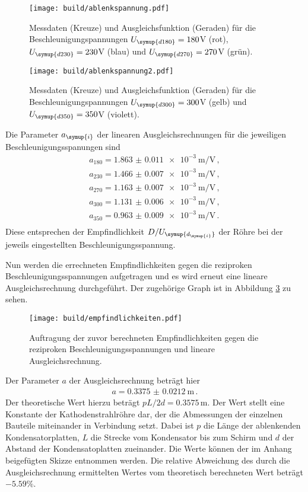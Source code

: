 \begin{figure}[]
  \centering
  \texttt{[image: build/ablenkspannung.pdf]}
  \caption{Messdaten (Kreuze) und Ausgleichsfunktion (Geraden) für die Beschleunigungspannungen
  $U_{\symup{d180}}=180$V (rot), $U_{\symup{d230}}=230$V (blau) und $U_{\symup{d270}}=270$V (grün).}
  \label{fig:ablenkspannung}
\end{figure}

\begin{figure}[]
  \centering
  \texttt{[image: build/ablenkspannung2.pdf]}
  \caption{Messdaten (Kreuze) und Ausgleichsfunktion (Geraden) für die Beschleunigungspannungen
  $U_{\symup{d300}}=300$V (gelb) und $U_{\symup{d350}}=350$V (violett).}
  \label{fig:ablenkspannung2}
\end{figure}

\newpage
Die Parameter $a_{\symup{i}}$ der linearen Ausgleichsrechnungen für die jeweiligen
Beschleunigungsspanungen sind
\begin{align*}
  a_{180} = \SI{1.863(0011)e-3}{\meter\per\volt} \,, \\
  a_{230} = \SI{1.466(0007)e-3}{\meter\per\volt}  \,, \\
  a_{270} = \SI{1.163(0007)e-3}{\meter\per\volt}  \,,\\
  a_{300} = \SI{1.131(0006)e-3}{\meter\per\volt}  \,,\\
  a_{350} = \SI{0.963(0009)e-3}{\meter\per\volt} \,.\\
\end{align*}
Diese entsprechen der Empfindlichkeit $D/U_{\symup{d_{\symup{i}}}}$ der Röhre bei
der jeweils eingestellten Beschleunigungsspannung.

Nun werden die errechneten Empfindlichkeiten gegen die reziproken Beschleunigungsspannungen
aufgetragen und es wird erneut eine lineare Ausgleichsrechnung durchgeführt. Der
zugehörige Graph ist in Abbildung \ref{fig:empfindlichkeiten} zu sehen.

\begin{figure}[]
  \centering
  \texttt{[image: build/empfindlichkeiten.pdf]}
  \caption{Auftragung der zuvor berechneten Empfindlichkeiten gegen die reziproken
  Beschleunigungsspannungen und lineare Ausgleichsrechnung.}
  \label{fig:empfindlichkeiten}
\end{figure}

Der Parameter $a$ der Ausgleichsrechnung beträgt hier
\begin{align*}
  a=\SI{0.3375(00212)}{\meter} \,.
\end{align*}
Der theoretische Wert hierzu beträgt $pL/2d=0.3575\,$m. Der Wert stellt eine
Konstante der Kathodenstrahlröhre dar, der die Abmessungen der einzelnen Bauteile
miteinander in Verbindung setzt. Dabei ist $p$ die
Länge der ablenkenden Kondensatorplatten, $L$ die Strecke vom Kondensator bis zum
Schirm und $d$ der Abstand der Kondensatoplatten zueinander. Die Werte können der
im Anhang beigefügten Skizze entnommen werden. Die relative Abweichung
des durch die Ausgleichsrechnung ermittelten Wertes vom theoretisch berechneten Wert
beträgt $-5.59\%$.


